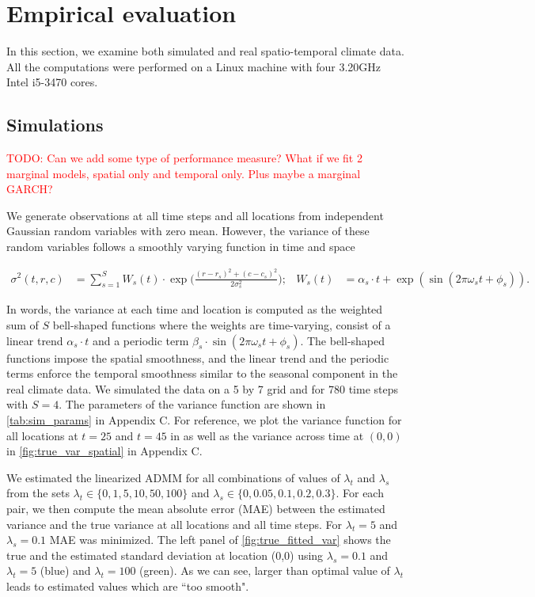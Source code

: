 \documentclass{article}
\newcommand{\attn}[1]{\textcolor{red}{TODO: #1}}
\begin{document}
\section{Empirical evaluation}
\label{sec:empirical-evaluation}

In this section, we examine both simulated and real spatio-temporal
climate data. All the computations were performed on a Linux machine
with four 3.20GHz Intel i5-3470 cores. 

\subsection{Simulations}
\label{sec:simulations}

\attn{Can we add some type of performance measure? What if we fit 2
  marginal models, spatial only and temporal only. Plus maybe a
  marginal GARCH?}

We generate observations at all time steps and all locations from
independent Gaussian random variables with zero mean. However, the
variance of these random variables follows a smoothly varying function
in time and space

\begin{align}
\sigma^2(t,r,c) & =\sum_{s=1}^{S} W_s(t) \cdot \exp\bigg( \frac{(r-r_s)^2+(c-c_s)^2}{2\sigma_s^2} \bigg); &
W_s(t) & =\alpha_s \cdot t + \exp(\sin(2\pi\omega_s t+\phi_s)) .
\label{eq:sourceVar}
\end{align}

In words, the variance at each time and location is computed as the weighted sum of $S$ bell-shaped functions where the weights are time-varying, consist of a linear trend $\alpha_s \cdot t$ and a periodic term $\beta_s \cdot \sin(2\pi\omega_s t+\phi_s)$. The bell-shaped functions impose the spatial smoothness, and the linear trend and the periodic terms enforce the temporal smoothness similar to the seasonal component in the real climate data. We simulated the data on a 5 by 7 grid and for 780 time steps with $S=4$. The parameters of the variance function are shown in \autoref{tab:sim_params} in Appendix C. For reference, we plot the variance function for all locations at $t=25$ and $t=45$ in as well as the variance across time at $(0,0)$ in \autoref{fig:true_var_spatial} in Appendix C.

We estimated the linearized ADMM for all combinations of values of
$\lambda_t$ and $\lambda_s$ from the sets $\lambda_t \in
\{0,1,5,10,50,100\}$ and $\lambda_s \in \{0,0.05,0.1,0.2,0.3\}$. For
each pair, we then compute the mean absolute error (MAE) between the
estimated variance and the true variance at all locations and all time
steps. For $\lambda_t=5$ and $\lambda_s=0.1$ MAE was minimized. The
left panel of \autoref{fig:true_fitted_var} shows the true and the
estimated standard deviation at location (0,0) using $\lambda_s=0.1$
and $\lambda_t=5$ (blue) and $\lambda_t=100$ (green). As we can see,
larger than optimal value of $\lambda_t$ leads to estimated values
which are ``too smooth".  
\end{document}
